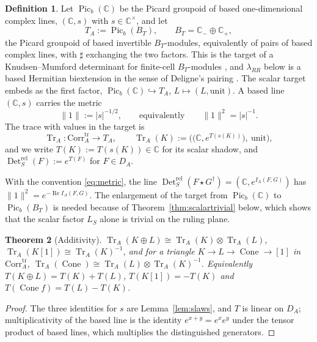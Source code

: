 \documentclass[11pt]{amsart}
\newtheorem{theorem}{Theorem}[section]
\theoremstyle{definition}
\newtheorem{definition}[theorem]{Definition}
\theoremstyle{remark}
\newcommand{\C}{\mathbb C}
\newcommand{\Tr}{\operatorname{Tr}}
\newcommand{\Rel}{\operatorname{Re}}
\newcommand{\Det}{\operatorname{Det}}
\newcommand{\Picb}{\operatorname{Pic}_{b}}
\newcommand{\Cone}{\operatorname{Cone}}
\newcommand{\DA}{D_A}
\newcommand{\Corrtr}{\mathrm{Corr}^{\mathrm{tr}}_{A}}
\newcommand{\BT}{B_T}
\begin{document}
\begin{definition}\label{def:target}
Let $\Picb(\C)$ be the Picard groupoid of based one-dimensional complex lines,
$(\C,s)$ with $s\in\C^{\times}$, and let
\begin{equation}\label{eq:target}
T_A:=\Picb(\BT),\qquad \BT=\C_-\oplus\C_+,
\end{equation}
the Picard groupoid of based invertible $\BT$-modules, equivalently of pairs of
based complex lines, with $\sharp$ exchanging the two factors.  This is the
target of a Knudsen--Mumford determinant for finite-cell $\BT$-modules
\cite{KnudsenMumford}, and $\lambda_{RR}$ below is a based Hermitian
biextension in the sense of Deligne's pairing \cite{Deligne}.  The scalar
target embeds as the first factor, $\Picb(\C)\hookrightarrow T_A$,
$L\mapsto(L,\mathrm{unit})$.  A based line $(\C,s)$ carries the metric
\begin{equation}\label{eq:metric}
\lVert1\rVert:=|s|^{-1/2},\qquad\text{equivalently}\qquad
\lVert1\rVert^{2}=|s|^{-1} .
\end{equation}
The trace with values in the target is
\begin{equation}\label{eq:TrA}
\Tr_A:\Corrtr\to T_A,\qquad
\Tr_A(K):=\bigl(\bigl(\C,e^{T(s(K))}\bigr),\ \mathrm{unit}\bigr),
\end{equation}
and we write $T(K):=T(s(K))\in\C$ for its scalar shadow, and
$\Det^{\mathrm{rel}}_S(F):=e^{T(F)}$ for $F\in\DA$.
\end{definition}

With the convention \eqref{eq:metric}, the line
$\Det^{\mathrm{rel}}_S(F\star G^{\dagger})=(\C,e^{I_A(F,G)})$ has
$\lVert1\rVert^{2}=e^{-\Rel I_A(F,G)}$.  The enlargement of the target from
$\Picb(\C)$ to $\Picb(\BT)$ is needed because of Theorem~\ref{thm:scalartrivial}
below, which shows that the scalar factor $L_S$ alone is trivial on the ruling
plane.

\begin{theorem}[Additivity]\label{thm:additivity}
$\Tr_A(K\oplus L)\cong\Tr_A(K)\otimes\Tr_A(L)$,
$\Tr_A(K[1])\cong\Tr_A(K)^{-1}$, and for a triangle $K\to L\to\Cone\to[1]$ in
$\Corrtr$, $\Tr_A(\Cone)\cong\Tr_A(L)\otimes\Tr_A(K)^{-1}$.  Equivalently
$T(K\oplus L)=T(K)+T(L)$, $T(K[1])=-T(K)$ and $T(\Cone f)=T(L)-T(K)$.
\end{theorem}

\begin{proof}
The three identities for $s$ are Lemma~\ref{lem:slaws}, and $T$ is linear on
$\DA$; multiplicativity of the based line is the identity
$e^{x+y}=e^{x}e^{y}$ under the tensor product of based lines, which multiplies
the distinguished generators.
\end{proof}
\end{document}
